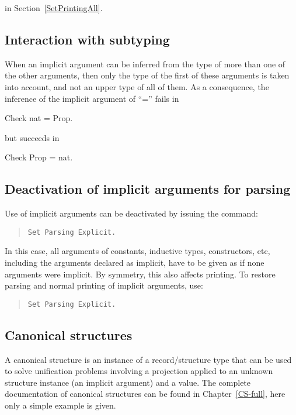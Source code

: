  in Section~\ref{SetPrintingAll}.

\subsection{Interaction with subtyping}

When an implicit argument can be inferred from the type of more than
one of the other arguments, then only the type of the first of these
arguments is taken into account, and not an upper type of all of
them.  As a consequence, the inference of the implicit argument of
``='' fails in

\begin{coq_example*}
Check nat = Prop.
\end{coq_example*}

but succeeds in 

\begin{coq_example*}
Check Prop = nat.
\end{coq_example*}

\subsection{Deactivation of implicit arguments for parsing}

Use of implicit arguments can be deactivated by issuing the command:
\begin{quote}
{\tt Set Parsing Explicit.}
\end{quote}

In this case, all arguments of constants, inductive types,
constructors, etc, including the arguments declared as implicit, have
to be given as if none arguments were implicit. By symmetry, this also
affects printing. To restore parsing and normal printing of implicit
arguments, use:
\begin{quote}
{\tt Set Parsing Explicit.}
\end{quote}

\subsection{Canonical structures
}

A canonical structure is an instance of a record/structure type that
can be used to solve unification problems involving a projection
applied to an unknown structure instance (an implicit argument) and
a value.  The complete documentation of canonical structures can be found
in Chapter~\ref{CS-full}, here only a simple example is given.

